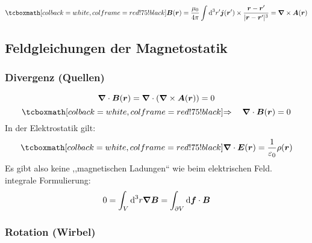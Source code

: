 
\begin{equation*}
\rmbox{\vec{B}(\vec{r}) = \frac{\mu_0}{4 \pi} \int \dd ^3 r' \vec{j}(\vec{r}') \times \frac{\vec{r} - \vec{r}'}{|\vec{r} - \vec{r}'|^3} = \vabla \times \vec{A}(\vec{r})}
\end{equation*}

\subsection{Feldgleichungen der Magnetostatik}

\subsubsection{Divergenz (Quellen)}

\begin{equation*}
\bm{\nabla} \cdot \bm{B}(\bm{r}) = \bm{\nabla} \cdot (\bm{\nabla} \times \bm{A}(\bm{r})) = 0
\end{equation*}
\begin{equation*}
\rmbox{\Rightarrow \quad \vabla \cdot \vec{B}(\vec{r}) = 0}
\end{equation*}
In der Elektrostatik gilt:
\begin{equation*}
\rmbox{\vabla \cdot \vec{E}(\vec{r}) = \frac{1}{\epsilon_0} \rho(\vec{r})}
\end{equation*}
Es gibt also keine ,,magnetischen Ladungen`` wie beim elektrischen Feld.\\[5pt]
integrale Formulierung:
\begin{equation*}
0 = \int_V \textrm{d}^3 r \bm{\nabla} \bm{B} = \int_{\partial V} \textrm{d} \bm{f} \cdot \bm{B}
\end{equation*}

\subsubsection{Rotation (Wirbel)}


